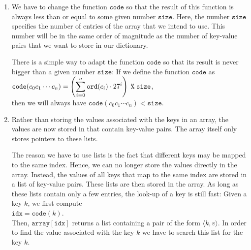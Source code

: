 \begin{enumerate}
\item We have to change the function  $\texttt{code}$ so that the result of this function is always
      less than or equal to some given number $\texttt{size}$.  Here, the number $\texttt{size}$ specifies
      the number of entries of the array that we intend to use.  This number will be in the same
      order of magnitude as the number of key-value pairs that we want to store in our dictionary.

      There is a simple way to adapt the function  $\texttt{code}$ so that its result is never bigger
      than a given number $\texttt{size}$: If we define the function $\texttt{code}$ as
      \\[0.2cm]
      \hspace*{1.3cm} 
      $\displaystyle\texttt{code}(c_0c_1\cdots c_n) = \left(\sum\limits_{i=0}^n \texttt{ord}(c_i) \cdot
        27^i\right) \;\texttt{\%}\; \texttt{size}$,
      \\[0.2cm]
      then we will always have $\texttt{code}(c_0c_1\cdots c_n) < \texttt{size}$.  
\item Rather than storing the values associated with the keys in an array, the values are now stored
      in  that contain key-value pairs.  The array itself only stores pointers to these
       lists. 
      
      The reason we have to use lists is the fact that different keys may be mapped to the
      same index.  Hence, we can no longer store the values directly in the array.  Instead,
      the values of all keys that map to the same index are stored in a
      list of key-value pairs.  These  lists are then stored in the array.  As long as
      these lists contain only a few entries, the look-up of a key is still fast: Given a key $k$,
      we first compute 
      \\[0.2cm]
      \hspace*{1.3cm}
      $\texttt{idx} = \texttt{code}(k)$.
      \\[0.2cm]
      Then, $\texttt{array}[\texttt{idx}]$ returns a list containing a pair of the form $\langle k, v \rangle$.
      In order to find the value associated with the key $k$ we have to search this list for the key
      $k$.
\end{enumerate}

